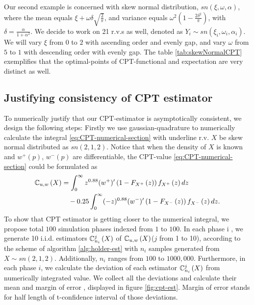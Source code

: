 Our second example is concerned with skew normal distribution, 
$sn(\xi, \omega, \alpha)$, where the mean equals 
$\xi + \omega \delta \sqrt{\frac{2}{\pi}}$, and variance equals 
$\omega^2(1 - \frac{2\delta^2}{\pi})$, with $\delta = \frac{\alpha}{1 + \alpha^2}$.
We decide to work on 21 r.v.s as well, denoted as $Y_i \sim sn(\xi_i, \omega_i, \alpha_i)$.
We will vary $\xi$ from $0$ to $2$ with ascending order and evenly gap, and vary $\omega$ from $5$ to $1$ with descending order with evenly gap. 
The table \ref{tab:skewNormalCPT} exemplifies that the optimal-points of CPT-functional and expectation are very distinct as well. 

\subsection{Justifying consistency of CPT estimator}
To numerically justify that our CPT-estimator is asymptotically consistent, we design the following steps:
Firstly we use gaussian-quadrature to numerically calculate the integral \eqref{eq:CPT-numerical-section} with underline r.v. $X$ be skew normal distributed as $sn(2,1,2)$. Notice that when the density of $X$ is known and $w^+(p)$, $w^-(p)$ are differentiable, the CPT-value \eqref{eq:CPT-numerical-section} could be formulated as
\begin{align}
\mathbb{C}_{u,w}\left( X \right) & = \int_0^{\infty} z^{0.88} (w^{+})^\prime \left(1 - F_{X^+}\left(z\right)\right) f_{X^+}\left(z\right)dz \\
&\quad - 0.25 \int_0^{\infty} (-z)^{0.88} (w^{-})^\prime \left(1 - F_{X^-}\left(z\right)\right) f_{X^-}\left(z\right) dz.
\end{align}
To show that CPT estimator is getting closer to the numerical integral, we propose total $100$ simulation phases indexed from $1$ to $100$. In each phase i , we generate 10 i.i.d. estimators $\mathbb{C}^j_{n_i}\left(X\right)$ of $\mathbb{C}_{u,w}\left( X\right)$($j$ from 1 to 10), according to the scheme of algorithm \ref{alg:holder-est} with $n_i$ samples generated from $X \sim sn(2,1,2)$. Additionally, $n_i$ ranges from $100$ to $1000,000$. Furthermore, in each phase $i$, we calculate the deviation of each estimator $\mathbb{C}^j_{n_i}\left(X\right)$ from numerically integrated value. We collect all the deviations and calculate their mean and margin of error , displayed in figure \ref{fig:cpt-est}. Margin of error stands for half length of t-confidence interval of those deviations.

